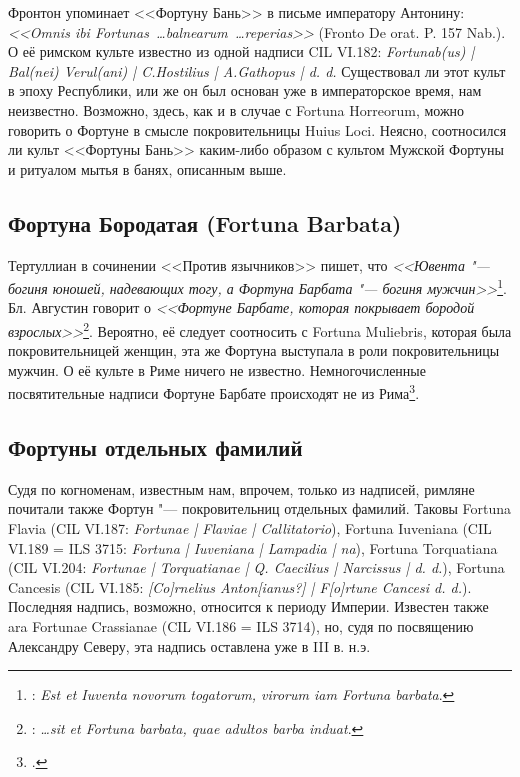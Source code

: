 Фронтон упоминает <<Фортуну Бань>> в письме императору Антонину: \textit{<<Omnis ibi Fortunas~\ldots balnearum~\ldots reperias>>} (Fronto De orat. P. 157 Nab.). О её римском культе известно из одной надписи CIL VI.182: \textit{Fortunab(us) | Bal(nei) Verul(ani) | C.Hostilius | A.Gathopus | d. d.} Существовал ли этот культ в эпоху Республики, или же он был основан уже в императорское время, нам неизвестно. Возможно, здесь, как и в случае с Fortuna Horreorum, можно говорить о Фортуне в смысле покровительницы Huius Loci. Неясно, соотносился ли культ <<Фортуны Бань>> каким-либо образом с культом Мужской Фортуны и ритуалом мытья в банях, описанным выше.

\subsection{Фортуна Бородатая (Fortuna Barbata)}\label{FortunaBarbata}

Тертуллиан в сочинении <<Против язычников>> пишет, что \textit{<<Ювента "--- богиня юношей, надевающих тогу, а Фортуна Барбата "--- богиня мужчин>>}\footnote{: \textit{Est et Iuventa novorum togatorum, virorum iam Fortuna barbata}.}. Бл. Августин говорит о \textit{<<Фортуне Барбате, которая покрывает бородой взрослых>>}\footnote{: \textit{\ldots{}sit et Fortuna barbata, quae adultos barba induat}.}. Вероятно, её следует соотносить с Fortuna Muliebris, которая была покровительницей женщин, эта же Фортуна выступала в роли покровительницы мужчин. О её культе в Риме ничего не известно. Немногочисленные посвятительные надписи Фортуне Барбате происходят не из Рима\footcite[Sp. 1519.]{Peter1890Fortuna}.

\subsection{Фортуны отдельных фамилий}\label{FortunaeFamiliarum}

Судя по когноменам, известным нам, впрочем, только из надписей, римляне почитали также Фортун "--- покровительниц отдельных фамилий. Таковы Fortuna Flavia (CIL VI.187: \textit{Fortunae | Flaviae | Callitatorio}), Fortuna Iuveniana (CIL VI.189 = ILS 3715: \textit{Fortuna | Iuveniana | Lampadia | na}), Fortuna Torquatiana (CIL VI.204: \textit{Fortunae | Torquatianae | Q. Caecilius | Narcissus | d. d.}), Fortuna Cancesis (CIL VI.185: \textit{[Co]rnelius Anton[ianus?] | F[o]rtune Cancesi d. d.}). Последняя надпись, возможно, относится к периоду Империи. Известен также ara Fortunae Crassianae (CIL VI.186 = ILS 3714), но, судя по посвящению Александру Северу, эта надпись оставлена уже в III в. н.э.

